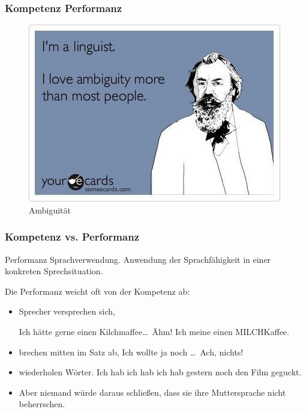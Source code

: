 \begin{frame}
\frametitle{Kompetenz \vs Performanz}

\begin{figure}
\centering
	\includegraphics[scale=.5]{material/08ambiguity}
	\caption{Ambiguität}
\end{figure}

\end{frame}


\begin{frame}
\frametitle{Kompetenz vs. Performanz}

\begin{block}{Performanz}
Sprachverwendung. Anwendung der Sprachfähigkeit in einer konkreten Sprechsituation.
\end{block}

\end{frame}


\begin{frame}

Die Performanz weicht oft von der Kompetenz ab: 
	\begin{itemize}
		\item Sprecher versprechen sich, 
		
\pause		
		\ea Ich hätte gerne einen Kilchmaffee\dots\ Ähm! Ich meine einen MILCHKaffee.
		\z

\pause	
		\item brechen mitten im Satz ab,
\pause		
		\ea Ich wollte ja noch \dots\ Ach, nichts!
		\z

		\item wiederholen Wörter.
\pause		
		\ea Ich hab ich hab ich hab gestern noch den Film geguckt.
		\z

		\item[]	Aber niemand würde daraus schließen, dass sie ihre Muttersprache nicht beherrschen.
	\end{itemize}

\end{frame}


